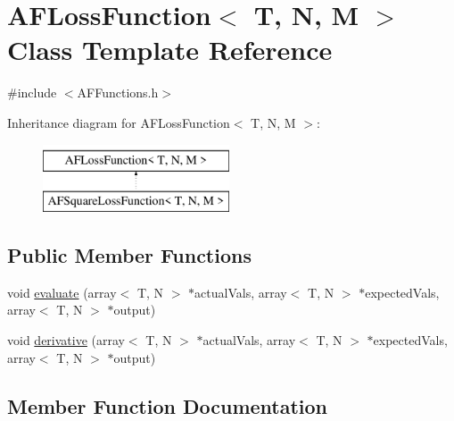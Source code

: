 \hypertarget{class_a_f_loss_function}{}\section{A\+F\+Loss\+Function$<$ T, N, M $>$ Class Template Reference}
\label{class_a_f_loss_function}


{\ttfamily \#include $<$A\+F\+Functions.\+h$>$}

Inheritance diagram for A\+F\+Loss\+Function$<$ T, N, M $>$\+:\begin{figure}[H]
\begin{center}
\leavevmode
\includegraphics[height=2.000000cm]{class_a_f_loss_function}
\end{center}
\end{figure}
\subsection*{Public Member Functions}
\begin{DoxyCompactItemize}
\item 
void \hyperlink{class_a_f_loss_function_a9008be15bf8a601ec1d1cee65f45d5e3}{evaluate} (array$<$ T, N $>$ $\ast$actual\+Vals, array$<$ T, N $>$ $\ast$expected\+Vals, array$<$ T, N $>$ $\ast$output)
\item 
void \hyperlink{class_a_f_loss_function_ae2cac33e935b6ad0547a79d869d1ecf8}{derivative} (array$<$ T, N $>$ $\ast$actual\+Vals, array$<$ T, N $>$ $\ast$expected\+Vals, array$<$ T, N $>$ $\ast$output)
\end{DoxyCompactItemize}


\subsection{Member Function Documentation}
\mbox{\label{class_a_f_loss_function_ae2cac33e935b6ad0547a79d869d1ecf8}} 
